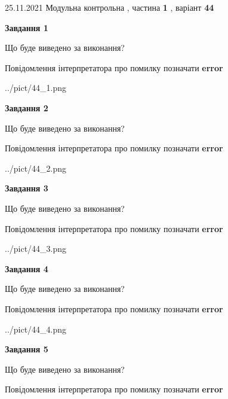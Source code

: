 \documentclass[10pt, ukrainian]{article}
\begin{document}
{25.11.2021 Модульна контрольна , частина \textbf { 1 }, варіант  \No \textbf { 44 }\par}
{
\begin {large}

{\begin {center}\textbf{Завдання 1}\end {center}}\par
Що буде виведено за виконання? \par
Повідомлення інтерпретатора про помилку позначати \textbf{error}

\begin{center}
	{../pict/44_1.png}
\end{center}
\newpage

{\begin {center}\textbf{Завдання 2}\end {center}}\par
Що буде виведено за виконання? \par
Повідомлення інтерпретатора про помилку позначати \textbf{error}

\begin{center}
	{../pict/44_2.png}
\end{center}
\newpage

{\begin {center}\textbf{Завдання 3}\end {center}}\par
Що буде виведено за виконання? \par
Повідомлення інтерпретатора про помилку позначати \textbf{error}

\begin{center}
	{../pict/44_3.png}
\end{center}
\newpage

{\begin {center}\textbf{Завдання 4}\end {center}}\par
Що буде виведено за виконання? \par
Повідомлення інтерпретатора про помилку позначати \textbf{error}

\begin{center}
	{../pict/44_4.png}
\end{center}
\newpage

{\begin {center}\textbf{Завдання 5}\end {center}}\par
Що буде виведено за виконання? \par
Повідомлення інтерпретатора про помилку позначати \textbf{error}


\end{large}}
\end{document}
